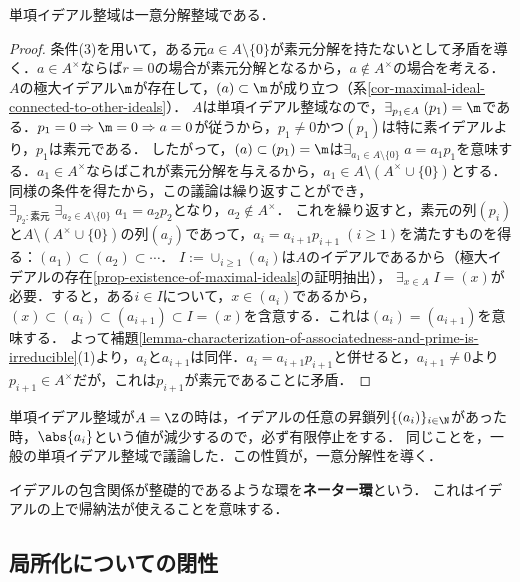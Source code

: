 \documentclass[uplatex,dvipdfmx]{jsreport}
\begin{document}
\begin{proposition}\label{prop-PID-then-UFD}
    単項イデアル整域は一意分解整域である．
\end{proposition}
\begin{proof}
    条件(3)を用いて，ある元$a\in A\setminus\{0\}$が素元分解を持たないとして矛盾を導く．$a\in A^\times$ならば$r=0$の場合が素元分解となるから，$a\notin A^\times$の場合を考える．
    $A$の極大イデアル$\m$が存在して，$(a)\subset\m$が成り立つ（系\ref{cor-maximal-ideal-connected-to-other-ideals}）．
    $A$は単項イデアル整域なので，$\exists_{p_1\in A}\;(p_1)=\m$である．$p_1=0\Rightarrow\m=0\Rightarrow a=0$が従うから，$p_1\ne 0$かつ$(p_1)$は特に素イデアルより，$p_1$は素元である．
    したがって，$(a)\subset(p_1)=\m$は$\exists_{a_1\in A\setminus\{0\}}\;a=a_1p_1$を意味する．$a_1\in A^\times$ならばこれが素元分解を与えるから，$a_1\in A\setminus(A^\times\cup\{0\})$とする．
    同様の条件を得たから，この議論は繰り返すことができ，$\exists_{p_2:素元}\;\exists_{a_2\in A\setminus\{0\}}\;a_1=a_2p_2$となり，$a_2\notin A^\times$．
    これを繰り返すと，素元の列$(p_i)$と$A\setminus(A^\times\cup\{0\})$の列$(a_j)$であって，$a_i=a_{i+1}p_{i+1}\;(i\ge 1)$を満たすものを得る：$(a_1)\subset(a_2)\subset\cdots$．
    $I:=\cup_{i\ge 1}(a_i)$は$A$のイデアルであるから（極大イデアルの存在\ref{prop-existence-of-maximal-ideals}の証明抽出），
    $\exists_{x\in A}\;I=(x)$が必要．すると，ある$i\in I$について，$x\in (a_i)$であるから，$(x)\subset(a_i)\subset(a_{i+1})\subset I=(x)$を含意する．これは$(a_i)=(a_{i+1})$を意味する．
    よって補題\ref{lemma-characterization-of-associatedness-and-prime-is-irreducible}(1)より，$a_i$と$a_{i+1}$は同伴．$a_i=a_{i+1}p_{i+1}$と併せると，$a_{i+1}\ne 0$より$p_{i+1}\in A^\times$だが，これは$p_{i+1}$が素元であることに矛盾．
\end{proof}
\begin{remarks}[単項イデアル整域はNoether環である]
    単項イデアル整域が$A=\Z$の時は，イデアルの任意の昇鎖列$\{(a_i)\}_{i\in\N}$があった時，$\abs{a_i}$という値が減少するので，必ず有限停止をする．
    同じことを，一般の単項イデアル整域で議論した．この性質が，一意分解性を導く．
\end{remarks}

\begin{definition}
    イデアルの包含関係が整礎的であるような環を\textbf{ネーター環}という．
    これはイデアルの上で帰納法が使えることを意味する．
\end{definition}

\subsection{局所化についての閉性}
\end{document}

